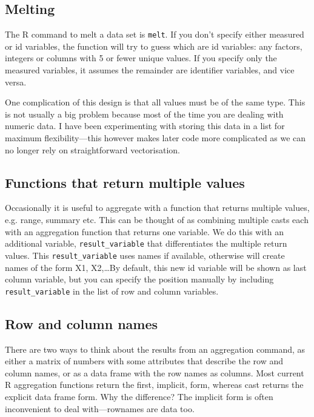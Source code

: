 \documentclass[]{article}
\begin{document}
\subsection{Melting}

The R command to melt a data set is \texttt{melt}.  If you don't specify either measured or id variables, the function will try to guess which are id variables: any factors, integers or columns with 5 or fewer unique values.  If you specify only the measured variables, it assumes the remainder are identifier variables, and vice versa.

One complication of this design is that all values must be of the same type.  This is not usually a big problem because most of the time you are dealing with numeric data.  I have been experimenting with storing this data in a list for maximum flexibility---this however makes later code more complicated as we can no longer rely on straightforward vectorisation.

\subsection{Functions that return multiple values}

Occasionally it is useful to aggregate with a function that returns multiple values, e.g. range, summary etc.  This can be thought of as combining multiple casts each with an aggregation function that returns one variable.  We do this with an additional variable, \texttt{result\_variable} that differentiates the multiple return values.  This \texttt{result\_variable} uses names if available, otherwise will create names of the form X1, X2,\dots  By default, this new id variable will be shown as last column variable, but you can specify the position manually by including \texttt{result\_variable} in the list of row and column variables.

\subsection{Row and column names}

There are two ways to think about the results from an aggregation command, as either a matrix of numbers with some attributes that describe the row and column names, or as a data frame with the row names as columns.  Most current R aggregation functions return the first, implicit, form, whereas cast returns the explicit data frame form.  Why the difference?  The implicit form is often inconvenient to deal with---rownames are data too.
\end{document}
